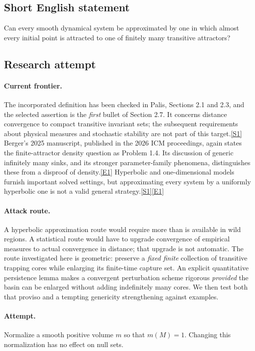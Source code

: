 \documentclass[11pt,a4paper]{article}
\newcommand{\sref}[2]{\hyperlink{source:#1:#2}{[S#2]}}
\newcommand{\eref}[2]{\hyperlink{extra:#1:#2}{[E#2]}}
\begin{document}
\subsection{Short English statement}
Can every smooth dynamical system be approximated by one in which almost every initial point is attracted to one of finitely many transitive attractors?
\subsection{Research attempt}

\paragraph{Current frontier.}
The incorporated definition has been checked in Palis, Sections 2.1 and
2.3, and the selected assertion is the \emph{first} bullet of Section 2.7.
It concerns distance convergence to compact transitive invariant sets;
the subsequent requirements about physical measures and stochastic
stability are not part of this target.\sref{205}{1}
Berger's 2025 manuscript, published in the 2026 ICM proceedings, again
states the finite-attractor density question as Problem 1.4. Its discussion
of generic infinitely many sinks, and its stronger parameter-family
phenomena, distinguishes these from a disproof of density.\eref{205}{1}
Hyperbolic and one-dimensional models furnish important solved settings,
but approximating every system by a uniformly hyperbolic one is not a
valid general strategy.\sref{205}{1}\eref{205}{1}

\paragraph{Attack route.}
A hyperbolic approximation route would require more than is available in
wild regions. A statistical route would have to upgrade convergence of
empirical measures to actual convergence in distance; that upgrade is
not automatic. The route investigated here is geometric: preserve a
\emph{fixed finite} collection of transitive trapping cores while enlarging
its finite-time capture set. An explicit quantitative persistence lemma
makes a convergent perturbation scheme rigorous \emph{provided} the basin
can be enlarged without adding indefinitely many cores. We then test both
that proviso and a tempting genericity strengthening against examples.

\paragraph{Attempt.}
Normalize a smooth positive volume $m$ so that $m(M)=1$. Changing this
normalization has no effect on null sets.
\end{document}
